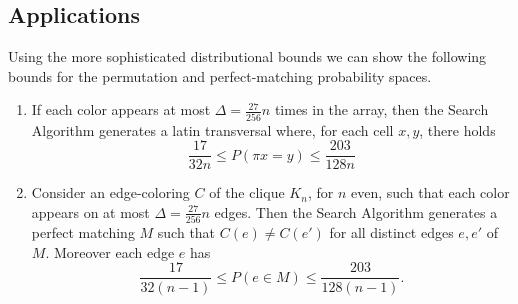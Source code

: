 \documentclass{toc}
\begin{document}
\subsection{Applications}  Using the more sophisticated distributional bounds we can show the following bounds for the permutation and perfect-matching probability spaces.
\begin{theorem}
\label{perm-cor1}
\begin{enumerate}
\item If each color appears at most $\Delta = \frac{27}{256} n$ times in the array, then the Search Algorithm generates a latin transversal where, for each cell $x,y$, there holds
$$
\frac{17}{32 n} \leq P( \pi x = y ) \leq \frac{203}{128 n}
$$
\item Consider an edge-coloring $C$ of the clique $K_n$, for $n$ even, such that each color appears on at most $\Delta = \frac{27}{256} n$ edges. Then the Search Algorithm generates a perfect matching $M$ such that $C(e) \neq C(e')$  for all distinct edges $e, e'$ of $M$.  Moreover each edge $e$ has
$$
\frac{17}{32 (n-1)} \leq P( e \in M) \leq \frac{203}{128(n-1)}.
$$
\end{enumerate}
\end{theorem}
\end{document}
